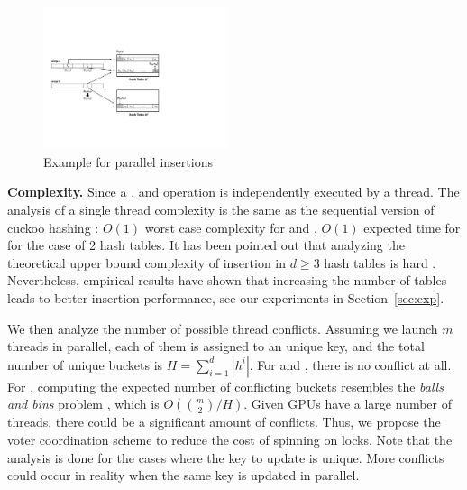 \begin{figure}[t]
	\centering
	\includegraphics[width=0.48\textwidth]{fig/Voter.pdf}
	\vspace{-1em}
	\caption{Example for parallel insertions}
	\label{fig:voter}
\end{figure}
\vspace{1mm}\noindent\textbf{Complexity.}
Since a ,  and  operation is independently executed by a thread. 
The analysis of a single thread complexity is the same as the sequential version of cuckoo hashing \cite{pagh2004cuckoo}: $O(1)$ worst case complexity for  and , $O(1)$ expected time for  for the case of 2 hash tables. 
It has been pointed out that analyzing the theoretical upper bound complexity of insertion in $d \geq 3$ hash tables is hard \cite{alcantara2009real}.  
Nevertheless, empirical results have shown that increasing the number of tables leads to better insertion performance, see our experiments in Section~\ref{sec:exp}.

We then analyze the number of possible thread conflicts. Assuming we launch $m$ threads in parallel, each of them is assigned to an unique key, and the total number of unique buckets is $H=\sum_{i=1}^d|h^i|$. For  and , there is no conflict at all. 
For , computing the expected number of conflicting buckets resembles the \emph{balls and bins} problem \cite{raab1998balls}, which is $O(\binom{m}{2}/H)$. 
Given GPUs have a large number of threads, there could be a significant amount of conflicts. Thus, we propose the voter coordination scheme to reduce the cost of spinning on locks. Note that the analysis is done for the cases where the key to update is unique. More conflicts could occur in reality when the same key is updated in parallel. 